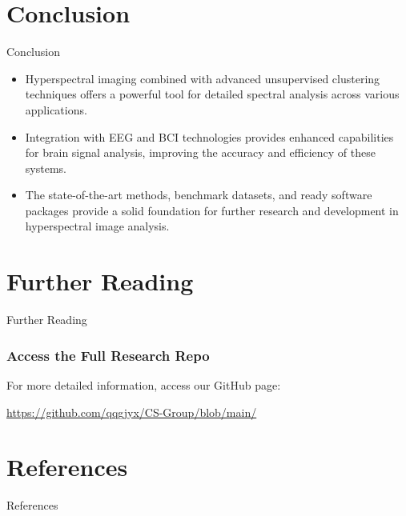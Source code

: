 \documentclass[10pt,svgnames,fragile]{beamer}
\begin{document}
\section{Conclusion}
\begin{frame}{Conclusion}
    \small
    \begin{itemize}
        \item Hyperspectral imaging combined with advanced unsupervised clustering techniques offers a powerful tool for detailed spectral analysis across various applications.
        \item Integration with EEG and BCI technologies provides enhanced capabilities for brain signal analysis, improving the accuracy and efficiency of these systems.
        \item The state-of-the-art methods, benchmark datasets, and ready software packages provide a solid foundation for further research and development in hyperspectral image analysis.
    \end{itemize}
\end{frame}

\section{Further Reading}
\begin{frame}{Further Reading}
    \frametitle{Access the Full Research Repo}
    For more detailed information, access our GitHub page:
    
    \vspace{1em} %
    
    \href{https://github.com/qqgjyx/CS-Group/blob/main/}{https://github.com/qqgjyx/CS-Group/blob/main/}
\end{frame}

\section{References}
\begin{frame}[allowframebreaks]{References}
\small


\end{frame}
\end{document}
